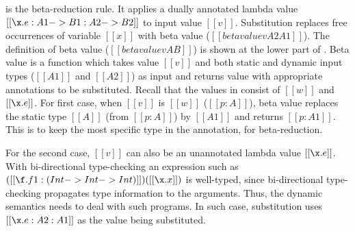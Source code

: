  is the beta-reduction rule. It applies a dually
annotated lambda value $[[\x.e : A1 -> B1 : A2 -> B2]]$ to input
value $[[v]]$. Substitution replaces free occurrences of variable
$[[x]]$ with beta value ($[[betavalue v A2 A1]]$).
The definition of beta value ($[[betavalue v A B]]$) is shown at the lower part of
.
Beta value is a function which takes
value $[[v]]$ and both static and dynamic input types
($[[A1]]$ and $[[A2]]$) as input and returns value with
appropriate annotations to be substituted.
Recall that the values in \cal consist of $[[w]]$ and $[[\x.e]]$.
For first case, when $[[v]]$ is $[[w]]$ ($[[p:A]]$), beta value replaces the static type
$[[A]]$ (from $[[p:A]]$) by $[[A1]]$ and returns $[[p:A1]]$.
This is to keep the most specific type in the annotation, for beta-reduction.
\begin{comment}
Using only $[[A2]]$ may lead to ill-typed programs. Consider
the following example:
\[
  [[ (\x . e : Top -> Int : Int -> Int) (1:Int) ]]
  [[-->]] [[ (\x . e : Int->Int) (1:Int) ]]
  [[-->]] [[ e [ x~>1:Int ] ]]
\]
%
Here we assume that reduction does not keep the dynamic type of lambdas,
and we will not be able to know $[[A1]]$ when doing beta-reduction.
We further assume the lambda that contains a switch expression that analyzes
the function input. Say $[[e]]$ is $[[switch x Char e1 Bool e2]]$.
It is acceptable because $[[x]]$ has type $[[Top]]$.
The function expects a term of type top, but it is given a integer to.
The switch expression $[[e]]$, if we substitute $[[x]]$ in it by $[[1 : Int]]$
it will be comes illegal because it has no branch dealt with an integer.
So we have to use the dynamic type $[[Top]]$ instead. And that is why
we need to keep two annotations for an lambda.
\end{comment}
For the second case, $[[v]]$ can also be an unannotated lambda value $[[\x.e]]$.
With bi-directional type-checking an expression such as
$([[\f.f 1: (Int -> Int -> Int)]]) ([[\x.x]])$
is well-typed, since bi-directional type-checking propagates
type information to the arguments. Thus, the dynamic semantics
needs to deal with such programs.
In such case, substitution uses $[[\x.e:A2:A1]]$ as the value being substituted.





